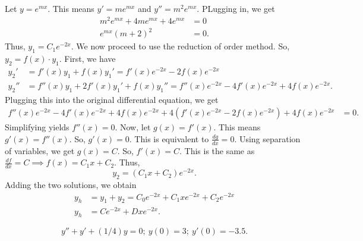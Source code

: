 \begin{soln}
    Let $y=e^{mx}$. This means $y'=me^{mx}$ and $y''=m^2e^{mx}$. PLugging in, 
    we get
    \begin{align*}
        m^2e^{mx}+4me^{mx}+4e^{mx} &= 0 \\
        e^{mx}(m+2)^2 &= 0.
    \end{align*}
    Thus, $\boxed{y_1 = C_1e^{-2x}}$. We now proceed to use the  \alert{reduction of order} 
    method.
    So, $y_2 = f(x)\cdot y_1$. First, we have 
    \begin{align*}
        y_2' &= f'(x)y_1+f(x)y_1' = f'(x)e^{-2x}-2f(x)e^{-2x}\\
        y_2'' &= f''(x)y_1+2f'(x)y_1'+f(x)y_1'' = f''(x)e^{-2x}-4f'(x)e^{-2x}+4f(x)e^{-2x}.
    \end{align*}
    Plugging this into the original differential equation, we get
    \begin{align*}
        f''(x)e^{-2x}-4f'(x)e^{-2x}+4f(x)e^{-2x} + 4\left(f'(x)e^{-2x}-2f(x)e^{-2x} \right)
        + 4f(x)e^{-2x} &= 0.
    \end{align*}
    Simplifying yields $f''(x) = 0$. Now, let $g(x) = f'(x)$. This means
    $g'(x) = f''(x)$. So, $g'(x) = 0$. This is equivalent to $\frac{dg}{dx} = 0$.
    Using separation of variables, we get $g(x) = C$. So, $f'(x) = C$. This is
    the same as $\frac{df}{dx} = C \implies f(x) = C_1x+C_2$. Thus,
    $$\boxed{y_2 = \left(C_1x+C_2\right)e^{-2x}}.$$
    Adding the two solutions, we obtain
    \begin{align*}
        y_h &= y_1 + y_2 = C_0e^{-2x} + C_1 xe^{-2x} +C_2e^{-2x} \\
        y_h &= Ce^{-2x} + Dxe^{-2x}.
    \end{align*}
\end{soln}
\begin{example}
    $$y''+y'+(1/4)y=0;~y(0) = 3; ~ y'(0) = -3.5.$$
\end{example}
